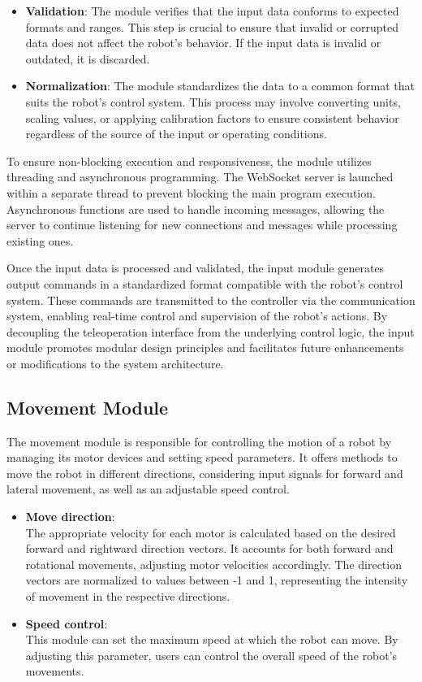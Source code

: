 \documentclass{article}
\begin{document}
\begin{itemize}
    \item \textbf{Validation}: 
    The module verifies that the input data conforms to expected formats and ranges. This step is crucial to ensure that invalid or corrupted data does not affect the robot's behavior. If the input data is invalid or outdated, it is discarded.
    
    \item \textbf{Normalization}: 
    The module standardizes the data to a common format that suits the robot's control system. This process may involve converting units, scaling values, or applying calibration factors to ensure consistent behavior regardless of the source of the input or operating conditions.
\end{itemize}

To ensure non-blocking execution and responsiveness, the module utilizes threading and asynchronous programming. The WebSocket server is launched within a separate thread to prevent blocking the main program execution. Asynchronous functions are used to handle incoming messages, allowing the server to continue listening for new connections and messages while processing existing ones.

Once the input data is processed and validated, the input module generates output commands in a standardized format compatible with the robot's control system. These commands are transmitted to the controller via the communication system, enabling real-time control and supervision of the robot's actions. By decoupling the teleoperation interface from the underlying control logic, the input module promotes modular design principles and facilitates future enhancements or modifications to the system architecture.

\subsection{Movement Module}
The movement module is responsible for controlling the motion of a robot by managing its motor devices and setting speed parameters. It offers methods to move the robot in different directions, considering input signals for forward and lateral movement, as well as an adjustable speed control.
\begin{itemize}
    \item \textbf{Move direction}: \\
     The appropriate velocity for each motor is calculated based on the desired forward and rightward direction vectors. It accounts for both forward and rotational movements, adjusting motor velocities accordingly. The direction vectors are normalized to values between -1 and 1, representing the intensity of movement in the respective directions.
     
    \item \textbf{Speed control}: \\
    This module can set the maximum speed at which the robot can move. By adjusting this parameter, users can control the overall speed of the robot's movements.
\end{itemize}
\end{document}
